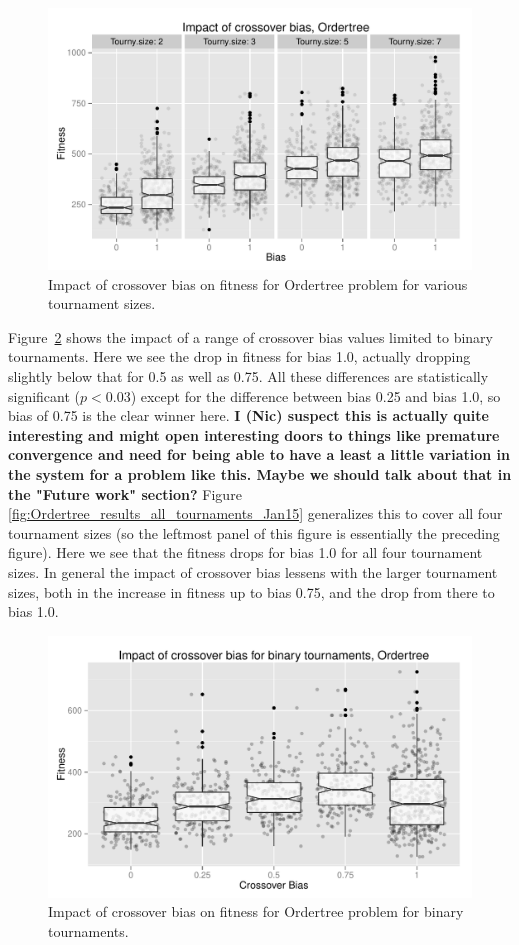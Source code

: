 \documentclass{sig-alternate}
\begin{document}
\begin{figure}
\centering
\includegraphics[width=0.45 \textwidth]{Plots/Ordertree_results_Jan15_facets.pdf}
\caption{Impact of crossover bias on fitness for Ordertree problem for various tournament sizes.}
\label{fig:Ordertree_results_Jan15_facets}
\end{figure}

Figure~\ref{fig:Ordertree_results_binary_tournaments_Jan15} shows the impact of a range of crossover bias values 
limited to binary tournaments. Here we see the drop in fitness for bias 1.0, actually dropping slightly below that for 0.5 
as well as 0.75. All these differences are statistically significant ($p < 0.03$) except for the difference between bias 
0.25 and bias 1.0, so bias of 0.75 is the clear winner here. \textbf{I (Nic) suspect this is actually quite interesting and 
might open interesting doors to things like premature convergence and need for being able to have a least a little 
variation in the system for a problem like this. Maybe we should talk about that in the "Future work" section?} Figure~
\ref{fig:Ordertree_results_all_tournaments_Jan15} generalizes this to cover all four tournament sizes (so the leftmost 
panel of this figure is essentially the preceding figure). Here we see that the fitness drops for bias 1.0 for all four 
tournament sizes. In general the impact of crossover bias lessens with the larger tournament sizes, both in the 
increase in fitness up to bias 0.75, and the drop from there to bias 1.0.

\begin{figure}
\centering
\includegraphics[width=0.45 \textwidth]{Plots/Ordertree_results_binary_tournaments_Jan15.pdf}
\caption{Impact of crossover bias on fitness for Ordertree problem for binary tournaments.}
\label{fig:Ordertree_results_binary_tournaments_Jan15}
\end{figure}
\end{document}
